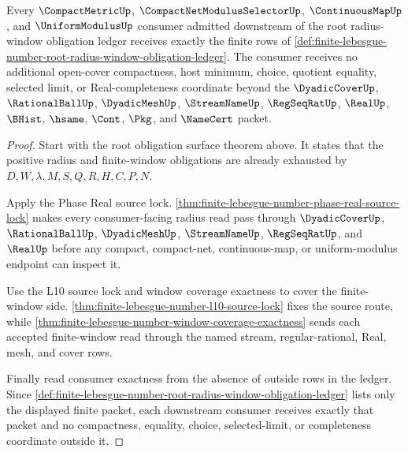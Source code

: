 \begin{theorem}
\label{thm:finite-lebesgue-number-root-radius-window-consumer-exactness}
Every $\CompactMetricUp$, $\CompactNetModulusSelectorUp$, $\ContinuousMapUp$, and $\UniformModulusUp$ consumer admitted downstream of the root radius-window obligation ledger receives exactly the finite rows of \autoref{def:finite-lebesgue-number-root-radius-window-obligation-ledger}. The consumer receives no additional open-cover compactness, host minimum, choice, quotient equality, selected limit, or Real-completeness coordinate beyond the $\DyadicCoverUp$, $\RationalBallUp$, $\DyadicMeshUp$, $\StreamNameUp$, $\RegSeqRatUp$, $\RealUp$, $\BHist$, $\hsame$, $\Cont$, $\Pkg$, and $\NameCert$ packet.
\end{theorem}
\begin{proof}
Start with the root obligation surface theorem above. It states that the positive radius and finite-window obligations are already exhausted by $D,W,\lambda,M,S,Q,R,H,C,P,N$.

Apply the Phase Real source lock. \autoref{thm:finite-lebesgue-number-phase-real-source-lock} makes every consumer-facing radius read pass through $\DyadicCoverUp$, $\RationalBallUp$, $\DyadicMeshUp$, $\StreamNameUp$, $\RegSeqRatUp$, and $\RealUp$ before any compact, compact-net, continuous-map, or uniform-modulus endpoint can inspect it.

Use the L10 source lock and window coverage exactness to cover the finite-window side. \autoref{thm:finite-lebesgue-number-l10-source-lock} fixes the source route, while \autoref{thm:finite-lebesgue-number-window-coverage-exactness} sends each accepted finite-window read through the named stream, regular-rational, Real, mesh, and cover rows.

Finally read consumer exactness from the absence of outside rows in the ledger. Since \autoref{def:finite-lebesgue-number-root-radius-window-obligation-ledger} lists only the displayed finite packet, each downstream consumer receives exactly that packet and no compactness, equality, choice, selected-limit, or completeness coordinate outside it.
\end{proof}
